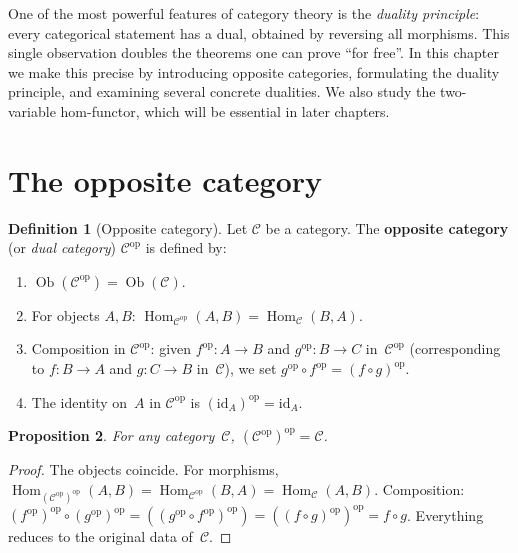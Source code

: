 \documentclass[a4paper,12pt]{book}
\DeclareMathOperator{\Hom}{Hom}
\DeclareMathOperator{\Ob}{Ob}
\newcommand{\op}{\mathrm{op}}
\newcommand{\id}{\mathrm{id}}
\theoremstyle{definition}
\newtheorem{definition}{Definition}[section]
\theoremstyle{plain}
\newtheorem{proposition}[definition]{Proposition}
\theoremstyle{remark}
\begin{document}
\vspace{1em}

One of the most powerful features of category theory is the
\emph{duality principle}: every categorical statement has a dual,
obtained by reversing all morphisms.  This single observation doubles the
theorems one can prove ``for free''.  In this chapter we make this
precise by introducing opposite categories, formulating the duality
principle, and examining several concrete dualities.  We also study the
two-variable hom-functor, which will be essential in later chapters.



\section{The opposite category}\label{sec:opposite-cat}

\begin{definition}[Opposite category]\label{def:opposite-cat}
Let $\mathcal{C}$ be a category.  The \textbf{opposite category} (or
\emph{dual category}) $\mathcal{C}^{\op}$ is defined by:
\begin{enumerate}[label=(\roman*)]
    \item $\Ob(\mathcal{C}^{\op}) = \Ob(\mathcal{C})$.
    \item For objects $A,B$:
          $\Hom_{\mathcal{C}^{\op}}(A,B) = \Hom_\mathcal{C}(B,A)$.
    \item Composition in $\mathcal{C}^{\op}$:
          given $f^{\op}\colon A\to B$ and $g^{\op}\colon B\to C$
          in~$\mathcal{C}^{\op}$ (corresponding to $f\colon B\to A$ and
          $g\colon C\to B$ in~$\mathcal{C}$), we set
          $g^{\op}\circ f^{\op} = (f\circ g)^{\op}$.
    \item The identity on~$A$ in $\mathcal{C}^{\op}$ is $(\id_A)^{\op}
          = \id_A$.
\end{enumerate}
\end{definition}

\begin{proposition}\label{prop:op-involution}
For any category~$\mathcal{C}$, $(\mathcal{C}^{\op})^{\op}=\mathcal{C}$.
\end{proposition}

\begin{proof}
The objects coincide.  For morphisms,
$\Hom_{(\mathcal{C}^{\op})^{\op}}(A,B)
= \Hom_{\mathcal{C}^{\op}}(B,A)
= \Hom_\mathcal{C}(A,B)$.
Composition: $(f^{\op})^{\op}\circ(g^{\op})^{\op}
= ((g^{\op}\circ f^{\op})^{\op})
= ((f\circ g)^{\op})^{\op}
= f\circ g$.
Everything reduces to the original data of~$\mathcal{C}$.
\end{proof}
\end{document}
